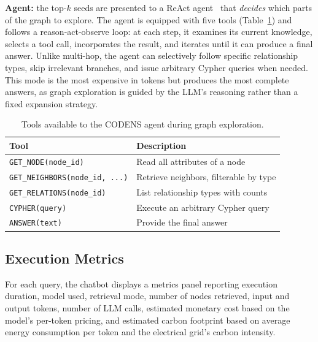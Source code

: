 \documentclass[sigconf]{acmart}
\begin{document}
\textbf{Agent:} the top-$k$ seeds are presented to a ReAct agent~\cite{Yao2023ReAct} that \emph{decides} which parts of the graph to explore. The agent is equipped with five tools (Table~\ref{tab:agent-tools}) and follows a reason-act-observe loop: at each step, it examines its current knowledge, selects a tool call, incorporates the result, and iterates until it can produce a final answer. Unlike multi-hop, the agent can selectively follow specific relationship types, skip irrelevant branches, and issue arbitrary Cypher queries when needed. This mode is the most expensive in tokens but produces the most complete answers, as graph exploration is guided by the LLM's reasoning rather than a fixed expansion strategy.

\begin{table}[h]
\centering
\small
\begin{tabular}{ll}
\toprule
\textbf{Tool} & \textbf{Description} \\
\midrule
\texttt{GET\_NODE(node\_id)} & Read all attributes of a node \\
\texttt{GET\_NEIGHBORS(node\_id, ...)} & Retrieve neighbors, filterable by type \\
\texttt{GET\_RELATIONS(node\_id)} & List relationship types with counts \\
\texttt{CYPHER(query)} & Execute an arbitrary Cypher query \\
\texttt{ANSWER(text)} & Provide the final answer \\
\bottomrule
\end{tabular}
\caption{Tools available to the CODENS agent during graph exploration.}
\label{tab:agent-tools}
\end{table}

\subsection{Execution Metrics}

For each query, the chatbot displays a metrics panel reporting execution duration, model used, retrieval mode, number of nodes retrieved, input and output tokens, number of LLM calls, estimated monetary cost based on the model's per-token pricing, and estimated carbon footprint based on average energy consumption per token and the electrical grid's carbon intensity.

\end{document}
